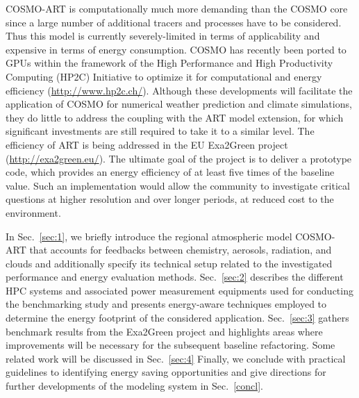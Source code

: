 COSMO-ART is  computationally much more demanding than  the COSMO core
since a  large number of additional  tracers and processes  have to be
considered.  Thus this model is currently severely-limited in terms of
applicability and expensive in terms of energy consumption.  COSMO has
recently  been  ported  to  GPUs  within the  framework  of  the  High
Performance  and  High  Productivity  Computing (HP2C)  Initiative  to
optimize    it    for     computational    and    energy    efficiency
(\url{http://www.hp2c.ch/}).    Although   these   developments   will
facilitate the  application of COSMO for  numerical weather prediction
and climate simulations,  they do little to address  the coupling with
the ART  model extension, for which significant  investments are still
required to take it to a similar level. The efficiency of ART is being
addressed        in       the        EU        Exa2Green       project
(\url{http://exa2green.eu/}). The  ultimate goal of the  project is to
deliver a  prototype code, which  provides an energy efficiency  of at
least five times of the  baseline value.  Such an implementation would
allow  the  community  to  investigate critical  questions  at  higher
resolution  and   over  longer  periods,   at  reduced  cost   to  the
environment.

In  Sec.~\ref{sec:1}, we  briefly introduce  the  regional atmospheric
model COSMO-ART \citep{Vogel-2009} that accounts for feedbacks between
chemistry,  aerosols, radiation, and  clouds and  additionally specify
its technical setup related to the investigated performance and energy
evaluation  methods.   Sec.~\ref{sec:2}  describes the  different  HPC
systems   and  associated  power   measurement  equipments   used  for
conducting the benchmarking study and presents energy-aware techniques
employed  to   determine  the  energy  footprint   of  the  considered
application.   Sec.~\ref{sec:3}  gathers  benchmark results  from  the
Exa2Green  project and  highlights  areas where  improvements will  be
necessary for the subsequent  baseline refactoring.  Some related work
will  be  discussed  in  Sec.~\ref{sec:4} Finally,  we  conclude  with
practical  guidelines to identifying  energy saving  opportunities and
give  directions for further  developments of  the modeling  system in
Sec.~\ref{concl}.

